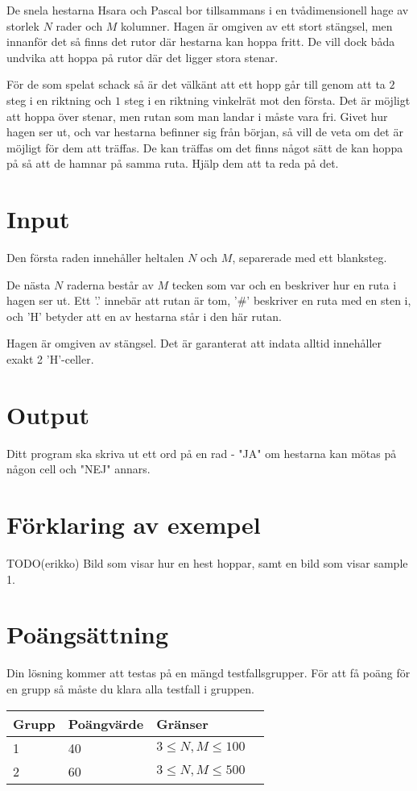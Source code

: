 De snela hestarna Hsara och Pascal bor tillsammans i en tvådimensionell hage av storlek $N$ rader och $M$ kolumner. Hagen är omgiven av ett stort stängsel, men innanför det så finns det rutor där hestarna kan hoppa fritt. De vill dock båda undvika att hoppa på rutor där det ligger stora stenar.

För de som spelat schack så är det välkänt att ett hopp går till genom att ta $2$ steg i en riktning och $1$ steg i en riktning vinkelrät mot den första. Det är möjligt att hoppa över stenar, men rutan som man landar i måste vara fri. Givet hur hagen ser ut, och var hestarna befinner sig från början, så vill de veta om det är möjligt för dem att träffas. De kan träffas om det finns något sätt de kan hoppa på så att de hamnar på samma ruta. Hjälp dem att ta reda på det.

\section*{Input}
Den första raden innehåller heltalen $N$ och $M$, separerade med ett blanksteg.

De nästa $N$ raderna består av $M$ tecken som var och en beskriver hur en ruta i hagen ser ut. Ett '.' innebär att rutan är tom, '\#' beskriver en ruta med en sten i, och 'H' betyder att en av hestarna står i den här rutan.

Hagen är omgiven av stängsel. Det är garanterat att indata alltid innehåller exakt 2 'H'-celler.

\section*{Output}
Ditt program ska skriva ut ett ord på en rad - "JA" om hestarna kan mötas på någon cell och "NEJ" annars.

\section*{Förklaring av exempel}
TODO(erikko) Bild som visar hur en hest hoppar, samt en bild som visar sample 1.

\section*{Poängsättning}
Din lösning kommer att testas på en mängd testfallsgrupper. För att få poäng för en grupp
så måste du klara alla testfall i gruppen.

\begin{tabular}{| l | l | l | l |}
\hline
Grupp & Poängvärde & Gränser \\ \hline
1 & 40 & $3 \le N,M \le 100$ \\ \hline
2 & 60 & $3 \le N,M \le 500$ \\ \hline
\end{tabular}
